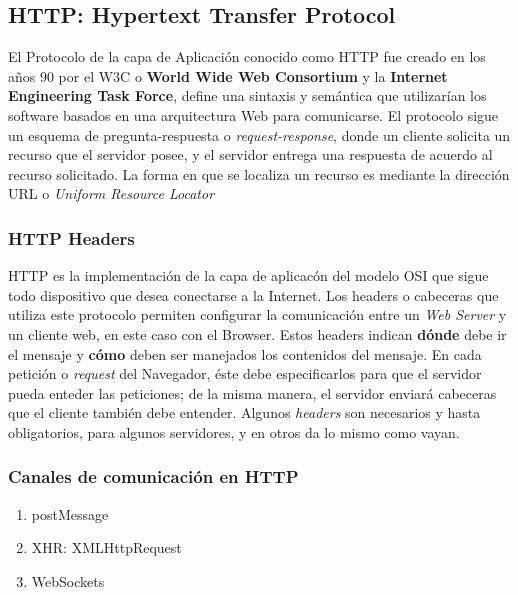     \subsection{HTTP: Hypertext Transfer Protocol}
    \label{chap2:HTTP}
    El Protocolo de la capa de Aplicación conocido como HTTP fue creado en los años 90 por el W3C o \textbf{World Wide Web Consortium} y la \textbf{Internet Engineering Task Force}, define una sintaxis y semántica que utilizarían los software basados en una arquitectura Web para comunicarse. El protocolo sigue un esquema de pregunta-respuesta o \textit{request-response}, donde un cliente solicita un recurso que el servidor posee, y el servidor entrega una respuesta de acuerdo al recurso solicitado. La forma en que se localiza un recurso es mediante la dirección URL o \textit{Uniform Resource Locator}

        \subsubsection{HTTP Headers}
        \label{chap2:headers}
        HTTP es la implementación de la capa de aplicacón del modelo OSI que sigue todo dispositivo que desea conectarse a la Internet. Los headers o cabeceras que utiliza este protocolo permiten configurar la comunicación entre un \textit{Web Server} y un cliente web, en este caso con el Browser. Estos headers indican \textbf{dónde} debe ir el mensaje y \textbf{cómo} deben ser manejados los contenidos del mensaje. En cada petición o \textit{request} del Navegador, éste debe especificarlos para que el servidor pueda enteder las peticiones; de la misma manera, el servidor enviará cabeceras que el cliente también debe entender. Algunos \textit{headers} son necesarios y hasta obligatorios, para algunos servidores, y en otros da lo mismo como vayan.


        \subsubsection{Canales de comunicación en HTTP}
        \label{chap2:comunHTTP}
        \begin{enumerate}
            \item postMessage

            \item XHR: XMLHttpRequest

            \item WebSockets
        \end{enumerate}


